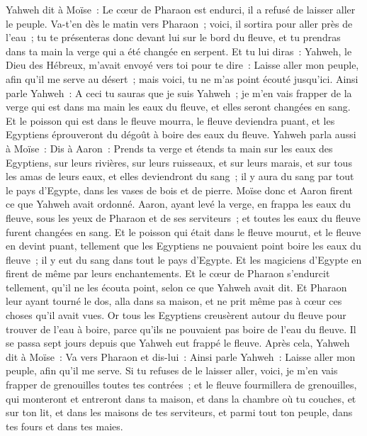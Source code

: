 \begin{multicols}{2}
Yahweh dit à Moïse~: Le cœur de Pharaon est endurci, il a refusé de laisser aller le peuple.
Va-t'en dès le matin vers Pharaon~; voici, il sortira pour aller près de l'eau~; tu te présenteras donc devant lui sur le bord du fleuve, et tu prendras dans ta main la verge qui a été changée en serpent.
Et tu lui diras~: Yahweh, le Dieu des Hébreux, m'avait envoyé vers toi pour te dire~: Laisse aller mon peuple, afin qu'il me serve au désert~; mais voici, tu ne m'as point écouté jusqu'ici.
Ainsi parle Yahweh~: A ceci tu sauras que je suis Yahweh~; je m'en vais frapper de la verge qui est dans ma main les eaux du fleuve, et elles seront changées en sang.
Et le poisson qui est dans le fleuve mourra, le fleuve deviendra puant, et les Egyptiens éprouveront du dégoût à boire des eaux du fleuve.
Yahweh parla aussi à Moïse~: Dis à Aaron~: Prends ta verge et étends ta main sur les eaux des Egyptiens, sur leurs rivières, sur leurs ruisseaux, et sur leurs marais, et sur tous les amas de leurs eaux, et elles deviendront du sang~; il y aura du sang par tout le pays d'Egypte, dans les vases de bois et de pierre.
Moïse donc et Aaron firent ce que Yahweh avait ordonné. Aaron, ayant levé la verge, en frappa les eaux du fleuve, sous les yeux de Pharaon et de ses serviteurs~; et toutes les eaux du fleuve furent changées en sang.
Et le poisson qui était dans le fleuve mourut, et le fleuve en devint puant, tellement que les Egyptiens ne pouvaient point boire les eaux du fleuve~; il y eut du sang dans tout le pays d'Egypte.
Et les magiciens d'Egypte en firent de même par leurs enchantements. Et le cœur de Pharaon s'endurcit tellement, qu'il ne les écouta point, selon ce que Yahweh avait dit.
Et Pharaon leur ayant tourné le dos, alla dans sa maison, et ne prit même pas à cœur ces choses qu'il avait vues.
Or tous les Egyptiens creusèrent autour du fleuve pour trouver de l'eau à boire, parce qu'ils ne pouvaient pas boire de l'eau du fleuve.
Il se passa sept jours depuis que Yahweh eut frappé le fleuve.
Après cela, Yahweh dit à Moïse~: Va vers Pharaon et dis-lui~: Ainsi parle Yahweh~: Laisse aller mon peuple, afin qu'il me serve.
Si tu refuses de le laisser aller, voici, je m'en vais frapper de grenouilles toutes tes contrées~;
et le fleuve fourmillera de grenouilles, qui monteront et entreront dans ta maison, et dans la chambre où tu couches, et sur ton lit, et dans les maisons de tes serviteurs, et parmi tout ton peuple, dans tes fours et dans tes maies.

\end{multicols}
